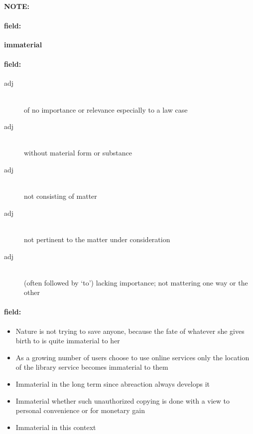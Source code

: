 \documentclass[12pt]{article}
\newenvironment{note}{\paragraph{NOTE:}}{}
\newenvironment{field}{\paragraph{field:}}{}
\begin{document}
\begin{note}
\begin{field}
\textbf{\large immaterial}
\end{field}


\begin{field}
\begin{description}
\item[adj] \hfill \\ 
of no importance or relevance especially to a law case

\item[adj] \hfill \\ 
without material form or substance

\item[adj] \hfill \\ 
not consisting of matter

\item[adj] \hfill \\ 
not pertinent to the matter under consideration

\item[adj] \hfill \\ 
(often followed by `to') lacking importance; not mattering one way or the other

\end{description}
\end{field}

\begin{field}
\begin{itemize}
\item Nature is not trying to save anyone, because the fate of whatever she gives birth to is quite immaterial to her
\item As a growing number of users choose to use online services only the location of the library service becomes immaterial to them
\item Immaterial in the long term since abreaction always develops it
\item Immaterial whether such unauthorized copying is done with a view to personal convenience or for monetary gain
\item Immaterial in this context
\end{itemize}
\end{field}
\end{note}
\end{document}
